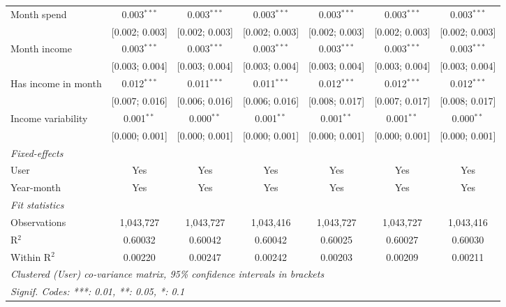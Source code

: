 \begin{table}[htbp]
\begin{threeparttable}[b]
\begin{tabular}{lcccccc}
         Month spend                & 0.003$^{***}$  & 0.003$^{***}$  & 0.003$^{***}$  & 0.003$^{***}$   & 0.003$^{***}$    & 0.003$^{***}$\\   
                                    & [0.002; 0.003] & [0.002; 0.003] & [0.002; 0.003] & [0.002; 0.003]  & [0.002; 0.003]   & [0.002; 0.003]\\   
         Month income               & 0.003$^{***}$  & 0.003$^{***}$  & 0.003$^{***}$  & 0.003$^{***}$   & 0.003$^{***}$    & 0.003$^{***}$\\   
                                    & [0.003; 0.004] & [0.003; 0.004] & [0.003; 0.004] & [0.003; 0.004]  & [0.003; 0.004]   & [0.003; 0.004]\\   
         Has income in month        & 0.012$^{***}$  & 0.011$^{***}$  & 0.011$^{***}$  & 0.012$^{***}$   & 0.012$^{***}$    & 0.012$^{***}$\\   
                                    & [0.007; 0.016] & [0.006; 0.016] & [0.006; 0.016] & [0.008; 0.017]  & [0.007; 0.017]   & [0.008; 0.017]\\   
         Income variability         & 0.001$^{**}$   & 0.000$^{**}$   & 0.001$^{**}$   & 0.001$^{**}$    & 0.001$^{**}$     & 0.000$^{**}$\\   
                                    & [0.000; 0.001] & [0.000; 0.001] & [0.000; 0.001] & [0.000; 0.001]  & [0.000; 0.001]   & [0.000; 0.001]\\   
         \midrule
         \emph{Fixed-effects}\\
         User                       & Yes            & Yes            & Yes            & Yes             & Yes              & Yes\\  
         Year-month                 & Yes            & Yes            & Yes            & Yes             & Yes              & Yes\\  
         \midrule
         \emph{Fit statistics}\\
         Observations               & 1,043,727      & 1,043,727      & 1,043,416      & 1,043,727       & 1,043,727        & 1,043,416\\  
         R$^2$                      & 0.60032        & 0.60042        & 0.60042        & 0.60025         & 0.60027          & 0.60030\\  
         Within R$^2$               & 0.00220        & 0.00247        & 0.00242        & 0.00203         & 0.00209          & 0.00211\\  
         \midrule \midrule
         \multicolumn{7}{l}{\emph{Clustered (User) co-variance matrix, 95\% confidence intervals in brackets}}\\
         \multicolumn{7}{l}{\emph{Signif. Codes: ***: 0.01, **: 0.05, *: 0.1}}\\
      \end{tabular}
   \end{threeparttable}
\end{table}



